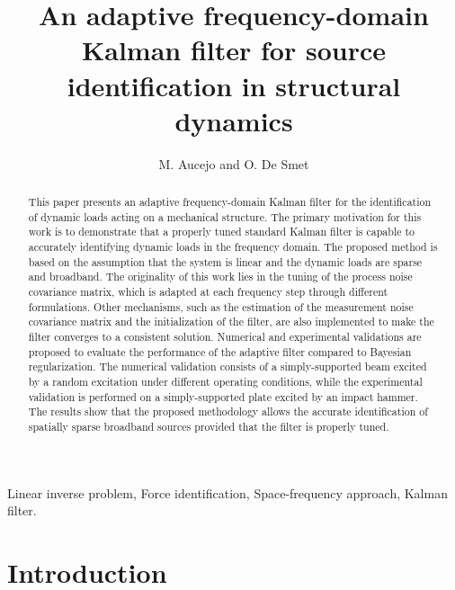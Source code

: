 \documentclass[5p,12pt]{elsarticle}
\begin{document}
\begin{frontmatter}

\title{An adaptive frequency-domain Kalman filter for source identification in structural dynamics}

\author[cor1]{M. Aucejo and O. De Smet}
\address[cor1]{Laboratoire de Mécanique des Structures et des Systèmes Couplés, Conservatoire National des Arts et Métiers, F 75003 Paris, France}

\begin{abstract}
	This paper presents an adaptive frequency-domain Kalman filter for the identification of dynamic loads acting on a mechanical structure. The primary motivation for this work is to demonstrate that a properly tuned standard Kalman filter is capable to accurately identifying dynamic loads in the frequency domain. The proposed method is based on the assumption that the system is linear and the dynamic loads are sparse and broadband.
	The originality of this work lies in the tuning of the process noise covariance matrix, which is adapted at each frequency step through different formulations. Other mechanisms, such as the estimation of the measurement noise covariance matrix and the initialization of the filter, are also implemented to make the filter converges to a consistent solution. Numerical and experimental validations are proposed to evaluate the performance of the adaptive filter compared to Bayesian regularization. The numerical validation consists of a simply-supported beam excited by a random excitation under different operating conditions, while the experimental validation is performed on a simply-supported plate excited by an impact hammer. The results show that the proposed methodology allows the accurate identification of spatially sparse broadband sources provided that the filter is properly tuned.
\end{abstract}
\begin{keyword}
	Linear inverse problem, Force identification, Space-frequency approach, Kalman filter.
\end{keyword}
\end{frontmatter}

\section{Introduction}\label{s:intro}
\end{document}
